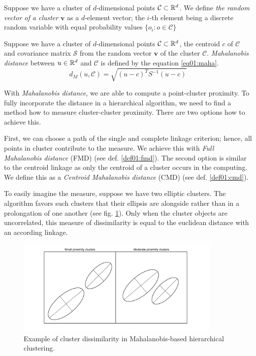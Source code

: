 \begin{defn}
	Suppose we have a cluster of $d$-dimensional points $\mathcal{C} \subset \mathbb{R}^d$. We define \emph{the random vector of a cluster} $\mathbf{v}$ as a $d$-element vector; the $i$-th element being a discrete random variable with equal probability values $\{o_i:o\in \mathcal{C}\}$
\end{defn}

\begin{defn}
	Suppose we have a cluster of $d$-dimensional points $\mathcal{C} \subset \mathbb{R}^d$, the centroid $c$ of $\mathcal{C}$ and covariance matrix $\mathcal{S}$ from the random vector $\mathbf{v}$ of the cluster $\mathcal{C}$. \emph{Mahalanobis distance} between $u \in \mathbb{R}^d$ and $\mathcal{C}$ is defined by the equation \ref{eq01:maha}.
	\begin{equation}\label{eq01:maha}
	d_M(u,\mathcal{C}) = \sqrt{(u-c)^TS^{-1}(u-c)}
	\end{equation}
	\label{def01:maha}
\end{defn}


With \emph{Mahalanobis distance}, we are able to compute a point-cluster proximity. To fully incorporate the distance in a hierarchical algorithm, we need to find a method how to measure cluster-cluster proximity. There are two options how to achieve this. 

First, we can choose a path of the single and complete linkage criterion; hence, all points in cluster contribute to the measure. We achieve this with \emph{Full Mahalanobis distance} (FMD) (see def. \ref{def01:fmd}).
The second option is similar to the centroid linkage as only the centroid of a cluster occurs in the computing. We define this as a \emph{Centroid Mahalanobis distance} (CMD) (see def. \ref{def01:cmd}).      

To easily imagine the measure, suppose we have two elliptic clusters. The algorithm favors such clusters that their ellipsis are alongside rather than in a prolongation of one another \cite{dagnelie1991using} (see fig. \ref{fig01:ellipses}). Only when the cluster objects are uncorrelated, this measure of dissimilarity is equal to the euclidean distance with an according linkage.

\begin{figure}\centering
	\includegraphics[width=10cm]{img/ellipses}
	\caption{Example of cluster dissimilarity in Mahalanobis-based hierarchical clustering.}
	\label{fig01:ellipses}
\end{figure}

